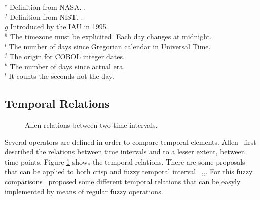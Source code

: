 \begin{table}
$^e$ Definition from NASA. \cite{Sch}. \\
$^f$ Definition from NIST. \cite{Nis}. \\
$g$ Introduced by the IAU in 1995. \\
$^h$ The timezone must be explicited. Each day changes at midnight. \\
$^i$ The number of days since Gregorian calendar in Universal Time. \\
$^j$ The origin for COBOL integer dates. \\
$^k$  The number of days since actual era. \\
$^l$  It counts the seconds not the day. \\
\end{table}


\subsection{Temporal Relations}
\def\JPicScale{0.5}
\begin{figure}[h]
\centering

\caption{Allen relations between two time intervals.}
\label{fig:allen}
\end{figure}

Several operators are defined in order to compare temporal elements. Allen~\cite{Allen83} first described the relations between time intervals and to a lesser extent, between time points. Figure \ref{fig:allen} shows the temporal relations. There are some proposals that can be applied to both crisp and fuzzy temporal interval ~\cite{ohlbach2004},\cite{nagypal2003},\cite{schockaert08}. For this fuzzy comparisons~\cite{garrido2009} proposed some different temporal relations that can be easyly implemented by means of regular fuzzy operations.



